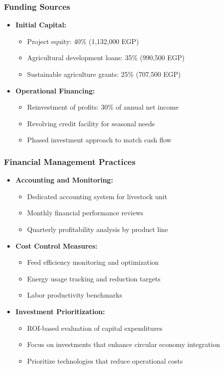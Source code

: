 \subsubsection{Funding Sources}
\begin{itemize}
    \item \textbf{Initial Capital:}
    \begin{itemize}
        \item Project equity: 40\% (1,132,000 EGP)
        \item Agricultural development loans: 35\% (990,500 EGP)
        \item Sustainable agriculture grants: 25\% (707,500 EGP)
    \end{itemize}
    
    \item \textbf{Operational Financing:}
    \begin{itemize}
        \item Reinvestment of profits: 30\% of annual net income
        \item Revolving credit facility for seasonal needs
        \item Phased investment approach to match cash flow
    \end{itemize}
\end{itemize}

\subsubsection{Financial Management Practices}
\begin{itemize}
    \item \textbf{Accounting and Monitoring:}
    \begin{itemize}
        \item Dedicated accounting system for livestock unit
        \item Monthly financial performance reviews
        \item Quarterly profitability analysis by product line
    \end{itemize}
    
    \item \textbf{Cost Control Measures:}
    \begin{itemize}
        \item Feed efficiency monitoring and optimization
        \item Energy usage tracking and reduction targets
        \item Labor productivity benchmarks
    \end{itemize}
    
    \item \textbf{Investment Prioritization:}
    \begin{itemize}
        \item ROI-based evaluation of capital expenditures
        \item Focus on investments that enhance circular economy integration
        \item Prioritize technologies that reduce operational costs
    \end{itemize}
\end{itemize}

